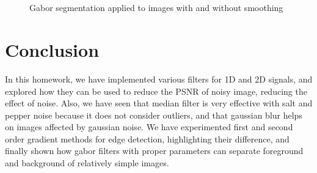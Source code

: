 \documentclass{article}
\begin{document}
\begin{figure}[h]
        \centering
    \caption{Gabor segmentation applied to images with and without smoothing}
    \qquad
    \\
    \qquad
    \\
    \qquad
    \label{fig:gabor_segm_3}
\end{figure}

\section{Conclusion}

In this homework, we have implemented various filters for 1D and 2D signals, and explored how they can be used to reduce the PSNR of noisy image, reducing the effect of noise. Also, we have seen that median filter is very effective with salt and pepper noise because it does not consider outliers, and that gaussian blur helps on images affected by gaussian noise. 
We have experimented first and second order gradient methods for edge detection, highlighting their difference, and finally shown how gabor filters with proper parameters can separate foreground and background of relatively simple images.



\end{document}
